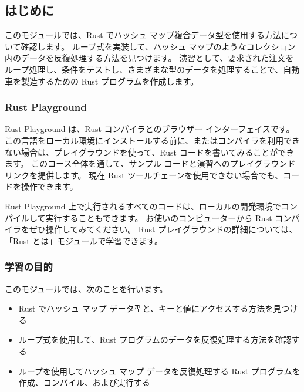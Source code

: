 \subsection{はじめに}

このモジュールでは、Rust でハッシュ マップ複合データ型を使用する方法について確認します。 ループ式を実装して、ハッシュ マップのようなコレクション内のデータを反復処理する方法を見つけます。 演習として、要求された注文をループ処理し、条件をテストし、さまざまな型のデータを処理することで、自動車を製造するための Rust プログラムを作成します。

\subsubsection{Rust Playground}

Rust Playground は、Rust コンパイラとのブラウザー インターフェイスです。 この言語をローカル環境にインストールする前に、またはコンパイラを利用できない場合は、プレイグラウンドを使って、Rust コードを書いてみることができます。 このコース全体を通して、サンプル コードと演習へのプレイグラウンド リンクを提供します。 現在 Rust ツールチェーンを使用できない場合でも、コードを操作できます。

Rust Playground 上で実行されるすべてのコードは、ローカルの開発環境でコンパイルして実行することもできます。 お使いのコンピューターから Rust コンパイラをぜひ操作してみてください。 Rust プレイグラウンドの詳細については、「Rust とは」モジュールで学習できます。

\subsubsection{学習の目的}

このモジュールでは、次のことを行います。

\begin{itemize}
\item Rust でハッシュ マップ データ型と、キーと値にアクセスする方法を見つける
\item ループ式を使用して、Rust プログラムのデータを反復処理する方法を確認する
\item ループを使用してハッシュ マップ データを反復処理する Rust プログラムを作成、コンパイル、および実行する
\end{itemize}
